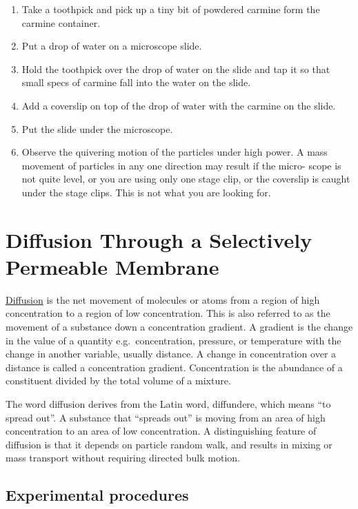\begin{enumerate}
\def\labelenumi{\arabic{enumi}.}
\tightlist
\item
  Take a toothpick and pick up a tiny bit of powdered carmine form the
  carmine container.
\item
  Put a drop of water on a microscope slide.
\item
  Hold the toothpick over the drop of water on the slide and tap it so
  that small specs of carmine fall into the water on the slide.
\item
  Add a coverslip on top of the drop of water with the carmine on the
  slide.
\item
  Put the slide under the microscope.
\item
  Observe the quivering motion of the particles under high power. A mass
  movement of particles in any one direction may result if the micro-
  scope is not quite level, or you are using only one stage clip, or the
  coverslip is caught under the stage clips. This is not what you are
  looking for.
\end{enumerate}

\section{Diffusion Through a Selectively Permeable
Membrane}\label{diffusion-through-a-selectively-permeable-membrane}

\href{https://en.wikipedia.org/wiki/Diffusion}{Diffusion} is the net
movement of molecules or atoms from a region of high concentration to a
region of low concentration. This is also referred to as the movement of
a substance down a concentration gradient. A gradient is the change in
the value of a quantity e.g.~concentration, pressure, or temperature
with the change in another variable, usually distance. A change in
concentration over a distance is called a concentration gradient.
Concentration is the abundance of a constituent divided by the total
volume of a mixture.

The word diffusion derives from the Latin word, diffundere, which means
``to spread out''. A substance that ``spreads out'' is moving from an
area of high concentration to an area of low concentration. A
distinguishing feature of diffusion is that it depends on particle
random walk, and results in mixing or mass transport without requiring
directed bulk motion.

\subsection{Experimental procedures}\label{experimental-procedures-14}

